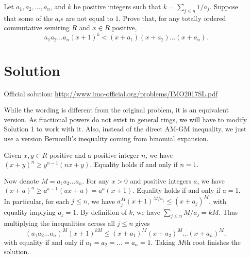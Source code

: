 Let $a_1, a_2, \ldots, a_n$, and $k$ be positive integers such that $k = \sum_{j \leq n} 1/a_j$.
Suppose that some of the $a_i$s are not equal to $1$.
Prove that, for any totally ordered commutative semiring $R$ and $x \in R$ positive,
\[ a_1 a_2 \ldots a_n (x + 1)^k < (x + a_1) (x + a_2) \ldots (x + a_n). \]



\section*{Solution}

Official solution: \url{http://www.imo-official.org/problems/IMO2017SL.pdf}

While the wording is different from the original problem, it is an equivalent version.
As fractional powers do not exist in general rings, we will have to modify Solution 1 to work with it.
Also, instead of the direct AM-GM inequality, we just use a version Bernoulli's inequality coming from binomial expansion.

Given $x, y \in R$ positive and a positive integer $n$, we have $(x + y)^n \geq y^{n - 1} (nx + y)$.
Equality holds if and only if $n = 1$.

Now denote $M = a_1 a_2 \ldots a_n$.
For any $x > 0$ and positive integers $a$, we have $(x + a)^a \geq a^{a - 1} (ax + a) = a^a (x + 1)$.
Equality holds if and only if $a = 1$.
In particular, for each $j \leq n$, we have $a_j^M (x + 1)^{M/a_j} \leq (x + a_j)^M$, with equality implying $a_j = 1$.
By definition of $k$, we have $\sum_{j \leq n} M/a_j = kM$.
Thus multiplying the inequalities across all $j \leq n$ gives
\[ (a_1 a_2 \ldots a_n)^M (x + 1)^{kM} \leq (x + a_1)^M (x + a_2)^M \ldots (x + a_n)^M, \]
    with equality if and only if $a_1 = a_2 = \ldots = a_n = 1$.
Taking $M$th root finishes the solution.
